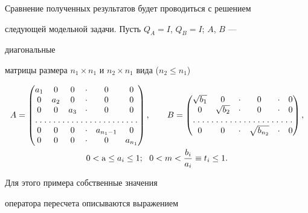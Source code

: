 Сравнение полученных результатов будет проводиться с решением 


следующей модельной задачи. Пусть $Q_A=I$, $Q_B=I$; $A$, $B$ --- 


диагональные 


матрицы размера $n_1\times n_1$ и $n_2\times n_1$ вида ($n_2\le n_1$) 


\begin{gather} 


A= 


\begin{pmatrix} 


a_1 & 0 & 0 & \cdot & 0 & 0 \\ 


0 & a_2 & 0 & \cdot & 0 & 0 \\ 


0 & 0 & a_3 & \cdot & 0 & 0 \\ 


\hdotsfor[1.5]{6} \\ 


0 & 0 & 0 & \cdot & a_{n_1-1} & 0 \\ 


0 & 0 & 0 & \cdot & 0 & a_{n_1} 


\end{pmatrix} 


,\qquad B= 


\begin{pmatrix} 


\sqrt{b_1} & 0 & \cdot & 0 & \cdot & 0 \\ 


0 & \sqrt{b_2} & \cdot & 0 & \cdot & 0 \\ 


\hdotsfor[1.5]{6} \\ 


0 & 0 & \cdot & \sqrt{b_{n_2}} & \cdot & 0 


\end{pmatrix} 


, \\ 


% 


0<\A\le a_i\le 1;\ \ 0<m<\frac{b_i}{a_i}\equiv t_i\le1.\notag 


\end{gather} 


Для этого примера собственные значения 


оператора пересчета описываются выражением 


$$ 


